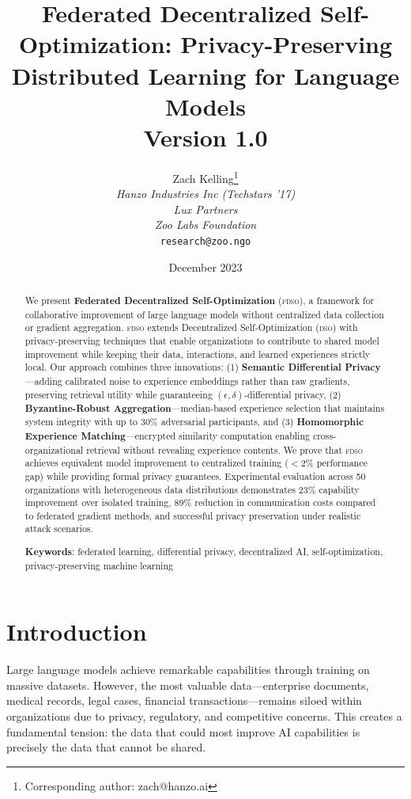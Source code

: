 \documentclass[11pt,letterpaper]{article}
\title{\textbf{Federated Decentralized Self-Optimization: Privacy-Preserving Distributed Learning for Language Models}\\
\large Version 1.0}
\author{
Zach Kelling\thanks{Corresponding author: zach@hanzo.ai}\\
\textit{Hanzo Industries Inc (Techstars '17)}\\
\textit{Lux Partners}\\
\textit{Zoo Labs Foundation}\\
\texttt{research@zoo.ngo}
}
\date{December 2023}
\newcommand{\DSO}{\textsc{dso}}
\newcommand{\FDSO}{\textsc{fdso}}
\begin{document}
\maketitle
\zoocover

\begin{abstract}
We present \textbf{Federated Decentralized Self-Optimization} (\FDSO{}), a framework for collaborative improvement of large language models without centralized data collection or gradient aggregation. \FDSO{} extends Decentralized Self-Optimization (\DSO{}) with privacy-preserving techniques that enable organizations to contribute to shared model improvement while keeping their data, interactions, and learned experiences strictly local. Our approach combines three innovations: (1) \textbf{Semantic Differential Privacy}---adding calibrated noise to experience embeddings rather than raw gradients, preserving retrieval utility while guaranteeing $(\epsilon, \delta)$-differential privacy, (2) \textbf{Byzantine-Robust Aggregation}---median-based experience selection that maintains system integrity with up to 30\% adversarial participants, and (3) \textbf{Homomorphic Experience Matching}---encrypted similarity computation enabling cross-organizational retrieval without revealing experience contents. We prove that \FDSO{} achieves equivalent model improvement to centralized training ($<2\%$ performance gap) while providing formal privacy guarantees. Experimental evaluation across 50 organizations with heterogeneous data distributions demonstrates 23\% capability improvement over isolated training, 89\% reduction in communication costs compared to federated gradient methods, and successful privacy preservation under realistic attack scenarios.

\textbf{Keywords}: federated learning, differential privacy, decentralized AI, self-optimization, privacy-preserving machine learning
\end{abstract}

\section{Introduction}

Large language models achieve remarkable capabilities through training on massive datasets. However, the most valuable data---enterprise documents, medical records, legal cases, financial transactions---remains siloed within organizations due to privacy, regulatory, and competitive concerns. This creates a fundamental tension: the data that could most improve AI capabilities is precisely the data that cannot be shared.
\end{document}
